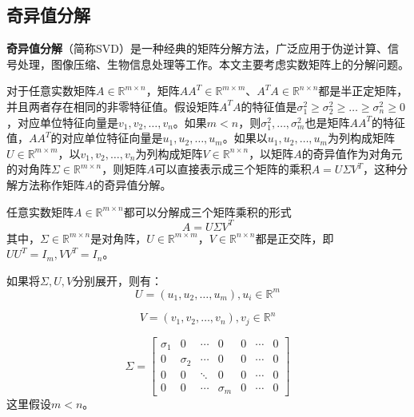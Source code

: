\subsection{奇异值分解}
\textbf{奇异值分解}（简称SVD）是一种经典的矩阵分解方法，广泛应用于伪逆计算、信号处理，图像压缩、生物信息处理等工作。本文主要考虑实数矩阵上的分解问题。

\begin{proposition}
对于任意实数矩阵$A\in \mathbb R^{m\times n}$，矩阵$AA^T\in \mathbb R^{m\times m}$、$A^TA\in \mathbb R^{n\times n}$都是半正定矩阵，并且两者存在相同的非零特征值。假设矩阵$A^TA$的特征值是$\sigma_1^2\ge \sigma_2^2 \ge \ldots \ge \sigma_n^2\ge 0$，对应单位特征向量是$v_1, v_2,\ldots, v_n$。如果$m<n$，则$\sigma_1^2,\ldots, \sigma_m^2$也是矩阵$AA^T$的特征值，$AA^T$的对应单位特征向量是$u_1,u_2,\ldots, u_m$。如果以$u_1,u_2,\ldots,u_m$为列构成矩阵$U\in \mathbb R^{m\times m}$，以$v_1,v_2,\ldots, v_n$为列构成矩阵$V\in \mathbb R^{n\times n}$，以矩阵$A$的奇异值作为对角元的对角阵$\Sigma\in \mathbb R^{m\times n}$，则矩阵$A$可以直接表示成三个矩阵的乘积$A = U\Sigma V^T$，这种分解方法称作矩阵$A$的奇异值分解。
\end{proposition}

任意实数矩阵$A\in \mathbb R^{m\times n}$都可以分解成三个矩阵乘积的形式
\begin{equation}\label{eq:svd}
  A = U\Sigma V^T
\end{equation}
其中，$\Sigma \in \mathbb R^{m\times n}$是对角阵，$U\in \mathbb R^{m\times m}$，$V\in \mathbb R^{n\times n}$都是正交阵，即$UU^T = I_m, VV^T = I_n$。

如果将$\Sigma, U, V$分别展开，则有：
\begin{equation}
  U = (u_1,u_2,\ldots,u_m), u_i\in \mathbb R^m
\end{equation}

\begin{equation}
  V = (v_1,v_2,\ldots,v_n), v_j\in \mathbb R^n
\end{equation}

\begin{equation}
\Sigma =
\begin{bmatrix}
\sigma_1 & 0 & \cdots & 0 & 0 & \cdots & 0\\
0 & \sigma_2 & \cdots & 0 & 0 & \cdots & 0\\
0 & 0 & \ddots & 0 & 0 & \cdots & 0\\
0 & 0 & \cdots & \sigma_m & 0 & \cdots & 0
\end{bmatrix}
\end{equation}
这里假设$m<n$。


